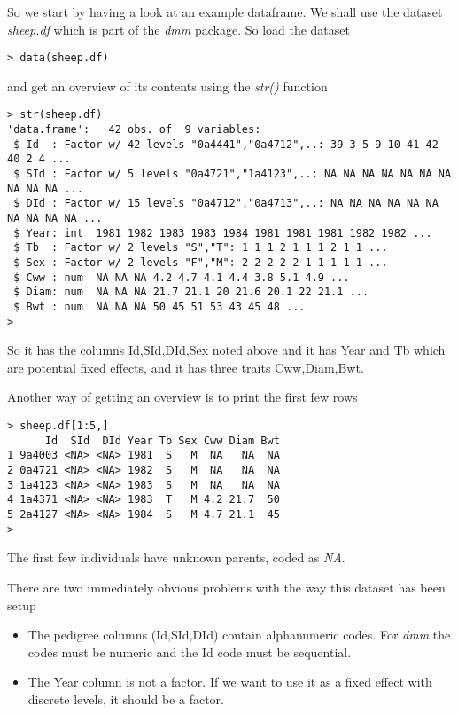 \documentclass[titlepage]{article}  %
\begin{document}
 So we start by having a look at an example dataframe.  We shall use the dataset {\em sheep.df} which is part of the {\em dmm} package. So load the dataset

\begin{verbatim}
> data(sheep.df)
\end{verbatim}

and get an overview of its contents using the {\em str()} function

\begin{verbatim}
> str(sheep.df)
'data.frame':	42 obs. of  9 variables:
 $ Id  : Factor w/ 42 levels "0a4441","0a4712",..: 39 3 5 9 10 41 42 40 2 4 ...
 $ SId : Factor w/ 5 levels "0a4721","1a4123",..: NA NA NA NA NA NA NA NA NA NA ...
 $ DId : Factor w/ 15 levels "0a4712","0a4713",..: NA NA NA NA NA NA NA NA NA NA ...
 $ Year: int  1981 1982 1983 1983 1984 1981 1981 1981 1982 1982 ...
 $ Tb  : Factor w/ 2 levels "S","T": 1 1 1 2 1 1 1 2 1 1 ...
 $ Sex : Factor w/ 2 levels "F","M": 2 2 2 2 2 1 1 1 1 1 ...
 $ Cww : num  NA NA NA 4.2 4.7 4.1 4.4 3.8 5.1 4.9 ...
 $ Diam: num  NA NA NA 21.7 21.1 20 21.6 20.1 22 21.1 ...
 $ Bwt : num  NA NA NA 50 45 51 53 43 45 48 ...
> 
\end{verbatim}

So it has the columns Id,SId,DId,Sex noted above and it has Year and Tb which are potential fixed effects, and it has three traits Cww,Diam,Bwt.

Another way of getting an overview is to print the first few rows

\begin{verbatim}
> sheep.df[1:5,]
      Id  SId  DId Year Tb Sex Cww Diam Bwt
1 9a4003 <NA> <NA> 1981  S   M  NA   NA  NA
2 0a4721 <NA> <NA> 1982  S   M  NA   NA  NA
3 1a4123 <NA> <NA> 1983  S   M  NA   NA  NA
4 1a4371 <NA> <NA> 1983  T   M 4.2 21.7  50
5 2a4127 <NA> <NA> 1984  S   M 4.7 21.1  45
> 
\end{verbatim}

The first few individuals have unknown parents, coded as {\em NA}.

There are two immediately obvious problems with the way this dataset has been setup
\begin{itemize}
\item The pedigree columns (Id,SId,DId) contain alphanumeric codes. For {\em dmm} the codes must be numeric and the Id code must be sequential.
\item The Year column is not a factor. If we want to use it as a fixed effect with discrete levels, it should be a factor.
\end{itemize}
\end{document}
